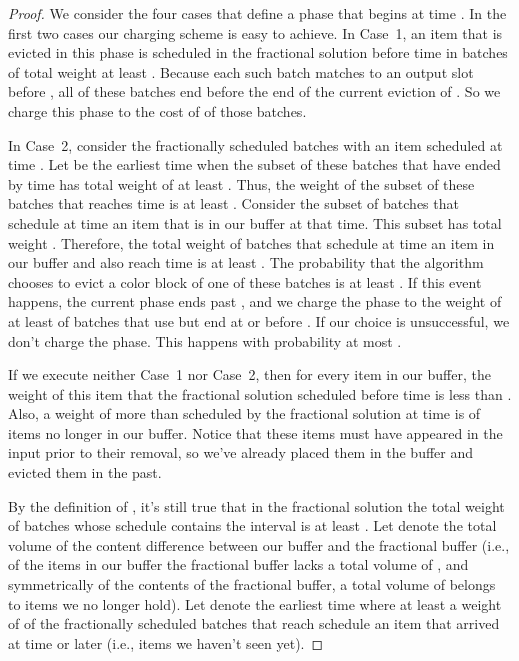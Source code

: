 \documentclass[12pt]{article}
\begin{document}
\begin{proof}
We consider the four cases that define a phase that
begins at time . In the first two cases our 
charging scheme is easy to achieve. In Case~1, 
an item  that is evicted in this phase is scheduled 
in the fractional solution before time  in batches 
of total weight at least . Because each such 
batch matches  to an output slot before , all 
of these batches end before the end of the current 
eviction of . So we charge this phase to the cost
of  of those batches.

In Case~2, consider the fractionally scheduled
batches with an item scheduled at time . Let  
be the earliest time when the subset of these batches 
that have ended by time  has total weight of at 
least . Thus, the weight of the subset of these 
batches that reaches time  is at least . 
Consider the subset of batches that schedule at 
time  an item that is in our buffer at that time. 
This subset has total weight . Therefore, 
the total weight of batches that schedule at time  
an item in our buffer and also reach time  is at least 
. The probability that the algorithm 
chooses to evict a color block of one of these batches
is at least .
If this event happens, the current phase ends past , and
we charge the phase to the weight of at least  
of batches that use  but end at or before .
If our choice is unsuccessful, we don't charge the phase. 
This happens with probability at most .

If we execute neither Case~1 nor Case~2, then for
every item in our buffer, the weight of this item that the 
fractional solution scheduled before time  
is less than . Also, a weight of more than 
 scheduled by the fractional solution at time 
 is of items no longer in our buffer. Notice that these items
must have appeared in the input prior to their removal, so 
we've already placed them in the buffer and evicted them in 
the past.

By the definition of , it's still true that in the fractional 
solution the total weight of batches whose schedule contains
the interval  is at least .
Let  denote the total volume of the content difference 
between our buffer and the fractional buffer (i.e., of the items 
in our buffer the fractional buffer lacks a total volume of ,
and symmetrically of the contents of the fractional buffer, a
total volume of  belongs to items we no longer hold). 
Let  denote the earliest time where at least a weight 
of  of the fractionally scheduled batches that reach 
 schedule an item that arrived at time  or later (i.e., 
items we haven't seen yet).


\end{proof}
\end{document}
